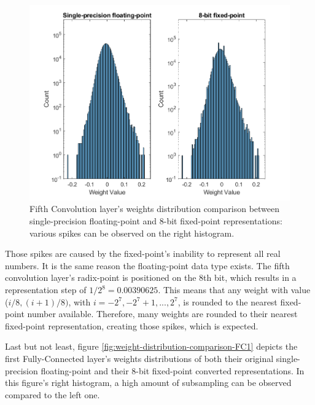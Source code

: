 \begin{figure} [H]
	\centering
	\includegraphics[scale=0.9]{Images/Weights-distributions/original-vs-fixed8/weight-distribution-conv5.png}
	\decoRule
	\caption[Fifth Convolution layer's weights distribution comparison between single-precision floating-point and 8-bit fixed-point representations]{Fifth Convolution layer's weights distribution comparison between single-precision floating-point and 8-bit fixed-point representations: various spikes can be observed on the right histogram.}
	\label{fig:weight-distribution-comparison-conv5}
\end{figure}

Those spikes are caused by the fixed-point's inability to represent all real numbers. It is the same reason the floating-point data type exists. The fifth convolution layer's radix-point is positioned on the 8th bit, which results in a representation step of $1/2^8 = 0.00390625$. This means that any weight with value ($i/8, (i + 1)/8)$, with $i=-2^7, -2^7 + 1, ..., 2^7$, is rounded to the nearest fixed-point number available. Therefore, many weights are rounded to their nearest fixed-point representation, creating those spikes, which is expected.

Last but not least, figure \ref{fig:weight-distribution-comparison-FC1} depicts the first Fully-Connected layer's weights distributions of both their original single-precision floating-point and their 8-bit fixed-point converted representations. In this figure's right histogram, a high amount of subsampling can be observed compared to the left one.

